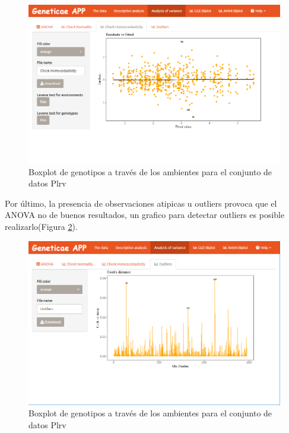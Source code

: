 \begin{figure}[H]
	\begin{center}
		\includegraphics[width=17cm]{./Graficos/Homocedasticidad.png}
	\end{center}
	\caption{Boxplot de genotipos a través de los ambientes para el conjunto de datos Plrv}
	\label{fig:fig49}
\end{figure}

Por último, la presencia de observaciones atipicas u outliers provoca que el ANOVA no de buenos resultados, un grafico para detectar outliers es posible realizarlo(Figura \ref{fig:fig49}).

\begin{figure}[H]
	\begin{center}
		\includegraphics[width=17cm]{./Graficos/Outliers.png}
	\end{center}
	\caption{Boxplot de genotipos a través de los ambientes para el conjunto de datos Plrv}
	\label{fig:fig49}
\end{figure}

